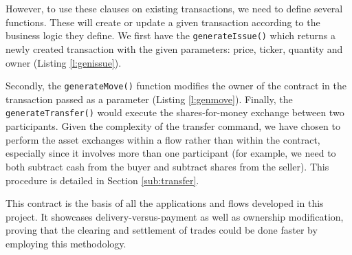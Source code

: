 \documentclass[12pt,twoside]{article}
\begin{document}
\\ \\
However, to use these clauses on existing transactions, we need to define several functions. These will create or update a given transaction according to the business logic they define. We first have the \verb|generateIssue()| which returns a newly created transaction with the given parameters: price, ticker, quantity and owner (Listing \ref{l:genissue}).

Secondly, the \verb|generateMove()| function modifies the owner of the contract in the transaction passed as a parameter (Listing \ref{l:genmove}). Finally, the \verb|generateTransfer()| would execute the shares-for-money exchange between two participants. Given the complexity of the transfer command, we have chosen to perform the asset exchanges within a flow rather than within the contract, especially since it involves more than one participant (for example, we need to both subtract cash from the buyer and subtract shares from the seller). This procedure is detailed in Section \ref{sub:transfer}.

This contract is the basis of all the applications and flows developed in this project. It showcases delivery-versus-payment as well as ownership modification, proving that the clearing and settlement of trades could be done faster by employing this methodology.
\end{document}
